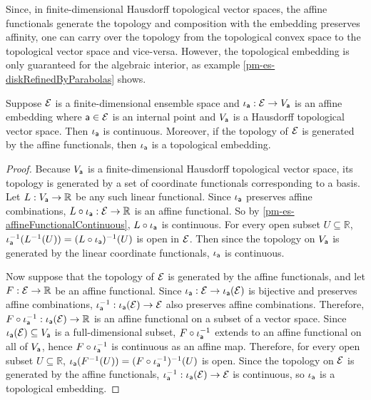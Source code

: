 Since, in finite-dimensional Hausdorff topological vector spaces, the affine functionals generate the topology and composition with the embedding preserves affinity, one can carry over the topology from the topological convex space to the topological vector space and vice-versa. However, the topological embedding is only guaranteed for the algebraic interior, as example \ref{pm-es-diskRefinedByParabolas} shows.

\begin{mathSection}
	\begin{prop}\label{pm-es-affineEmbeddingContFinDim}
		Suppose $\Ens$ is a finite-dimensional ensemble space and $\iota_{\ens[a]} : \Ens \to V_{\ens[a]}$ is an affine embedding where $\ens[a] \in \Ens$ is an internal point and $V_{\ens[a]}$ is a Hausdorff topological vector space. Then $\iota_{\ens[a]}$ is continuous. Moreover, if the topology of $\Ens$ is generated by the affine functionals, then $\iota_{\ens[a]}$ is a topological embedding.
	\end{prop}
	
	\begin{proof}
		Because $V_{\ens[a]}$ is a finite-dimensional Hausdorff topological vector space, its topology is generated by a set of coordinate functionals corresponding to a basis. Let $L : V_{\ens[a]} \to \mathbb{R}$ be any such linear functional. Since $\iota_{\ens[a]}$ preserves affine combinations, $L \circ \iota_{\ens[a]} : \Ens \to \mathbb{R}$ is an affine functional. So by \ref{pm-es-affineFunctionalContinuous}, $L \circ \iota_{\ens[a]}$ is continuous. For every open subset $U \subseteq \mathbb{R}$, $\iota_{\ens[a]}^{-1}(L^{-1}(U)) = (L \circ \iota_{\ens[a]})^{-1}(U)$ is open in $\Ens$. Then since the topology on $V_{\ens[a]}$ is generated by the linear coordinate functionals, $\iota_{\ens[a]}$ is continuous.
		
		Now suppose that the topology of $\Ens$ is generated by the affine functionals, and let $F : \Ens \to \mathbb{R}$ be an affine functional. Since $\iota_{\ens[a]} : \Ens \to \iota_{\ens[a]}(\Ens)$ is bijective and preserves affine combinations, $\iota_{\ens[a]}^{-1} : \iota_{\ens[a]}(\Ens) \to \Ens$ also preserves affine combinations. Therefore, $F \circ \iota_{\ens[a]}^{-1} : \iota_{\ens[a]}(\Ens) \to \mathbb{R}$ is an affine functional on a subset of a vector space. Since $\iota_{\ens[a]}(\Ens) \subseteq V_{\ens[a]}$ is a full-dimensional subset, $F \circ \iota_{\ens[a]}^{-1}$ extends to an affine functional on all of $V_{\ens[a]}$, hence $F \circ \iota_{\ens[a]}^{-1}$ is continuous as an affine map. Therefore, for every open subset $U \subseteq \mathbb{R}$, $\iota_{\ens[a]}(F^{-1}(U)) = (F \circ \iota_{\ens[a]}^{-1})^{-1}(U)$ is open. Since the topology on $\Ens$ is generated by the affine functionals, $\iota_{\ens[a]}^{-1} : \iota_{\ens[a]}(\Ens) \to \Ens$ is continuous, so $\iota_{\ens[a]}$ is a topological embedding.
	\end{proof}
	

\end{mathSection}
